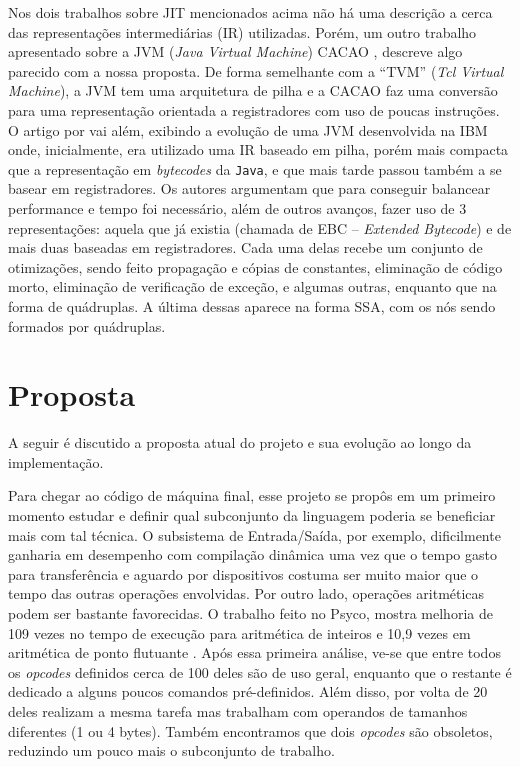 Nos dois trabalhos sobre JIT mencionados acima não há uma descrição
a cerca das representações intermediárias (IR) utilizadas. Porém, um
outro trabalho
apresentado sobre a JVM (\textit{Java Virtual Machine}) CACAO \cite{cacao},
descreve algo parecido com a nossa proposta. De forma semelhante com a
``TVM'' (\textit{Tcl Virtual Machine}), a JVM tem uma arquitetura de
pilha e a CACAO faz uma conversão para uma representação orientada a
registradores com uso de poucas instruções. O artigo por
 vai além, exibindo a evolução de uma JVM
desenvolvida na IBM onde, inicialmente, era utilizado uma IR baseado
em pilha, porém mais compacta que a representação em \textit{bytecodes} da
\texttt{Java}, e que mais tarde passou também a se basear em
registradores. Os autores argumentam que para conseguir balancear
performance e tempo foi necessário, além de outros avanços, fazer uso
de 3 representações: aquela que já existia (chamada de EBC --
\textit{Extended Bytecode}) e de mais duas baseadas em
registradores. Cada uma delas recebe um conjunto de otimizações, sendo
feito propagação e cópias de constantes, eliminação de código morto,
eliminação de verificação de exceção, e algumas outras, enquanto que na
forma de quádruplas. A última dessas aparece na forma SSA, com os nós
sendo formados por quádruplas.


\section{Proposta}
\label{proposta}

A seguir é discutido a proposta atual do projeto e sua evolução ao
longo da implementação.

Para chegar ao código de máquina final, esse projeto se propôs em
um primeiro momento estudar e definir qual subconjunto da linguagem poderia
se beneficiar mais com tal técnica. O subsistema de Entrada/Saída, por
exemplo, dificilmente ganharia em desempenho com compilação dinâmica
uma vez que o tempo gasto para transferência e aguardo por dispositivos
costuma ser muito maior que o tempo das outras operações envolvidas.
Por outro lado, operações aritméticas podem ser bastante favorecidas.
O trabalho feito no Psyco, mostra melhoria
de 109 vezes no tempo de execução para aritmética de inteiros e 10,9
vezes em aritmética de ponto flutuante \cite{psyco}. Após essa
primeira análise, ve-se que entre todos os
\textit{opcodes} definidos cerca de 100 deles são de
uso geral, enquanto que o restante é dedicado a alguns poucos comandos
pré-definidos. Além disso, por volta de 20 deles realizam a mesma
tarefa mas trabalham com operandos de tamanhos diferentes (1 ou 4
bytes). Também encontramos que dois \textit{opcodes} são obsoletos,
reduzindo um pouco mais o subconjunto de trabalho.

